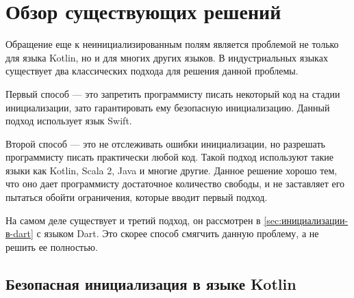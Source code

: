 \chapter{Обзор существующих решений}\label{ch:обзор-существующих-решений}

Обращение еще к неинициализированным полям является проблемой не только для языка Kotlin, но и для многих других языков.
В индустриальных языках существует два классических подхода для решения данной проблемы.

Первый способ --- это запретить программисту писать некоторый код на стадии инициализации,
зато гарантировать ему безопасную инициализацию.
Данный подход использует язык Swift.

Второй способ --- это не отслеживать ошибки инициализации, но разрешать программисту писать практически любой код.
Такой подход используют такие языки как Kotlin, Scala 2, Java и многие другие.
Данное решение хорошо тем, что оно дает программисту достаточное количество свободы,
и не заставляет его пытаться обойти ограничения, которые вводит первый подход.

На самом деле существует и третий подход, он рассмотрен в \autoref{sec:инициализации-в-dart} с языком Dart.
Это скорее способ смягчить данную проблему, а не решить ее полностью.

\section{Безопасная инициализация в языке Kotlin}\label{sec:безопасная-инициализация-в-языке-kotlin}


